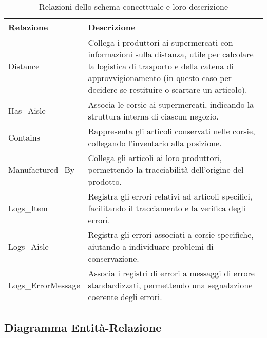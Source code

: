 \documentclass[a4paper,12pt]{article}
\begin{document}
\begin{table}[H]
\centering
\begin{tabularx}{\textwidth}{@{} l >{\RaggedRight\arraybackslash}X @{}}
\toprule
\textbf{Relazione} & \textbf{Descrizione} \\ \midrule
Distance & Collega i produttori ai supermercati con informazioni sulla distanza, utile per calcolare la logistica di trasporto e della catena di approvvigionamento (in questo caso per decidere se restituire o scartare un articolo). \\ 
Has\_Aisle & Associa le corsie ai supermercati, indicando la struttura interna di ciascun negozio. \\ 
Contains & Rappresenta gli articoli conservati nelle corsie, collegando l’inventario alla posizione. \\ 
Manufactured\_By & Collega gli articoli ai loro produttori, permettendo la tracciabilità dell’origine del prodotto. \\ 
Logs\_Item & Registra gli errori relativi ad articoli specifici, facilitando il tracciamento e la verifica degli errori. \\ 
Logs\_Aisle & Registra gli errori associati a corsie specifiche, aiutando a individuare problemi di conservazione. \\ 
Logs\_ErrorMessage & Associa i registri di errori a messaggi di errore standardizzati, permettendo una segnalazione coerente degli errori. \\ 
\bottomrule
\end{tabularx}
\caption{Relazioni dello schema concettuale e loro descrizione}
\label{tab:relationship-descriptions}
\end{table}

\subsection{Diagramma Entità-Relazione}
\newpage
\end{document}
